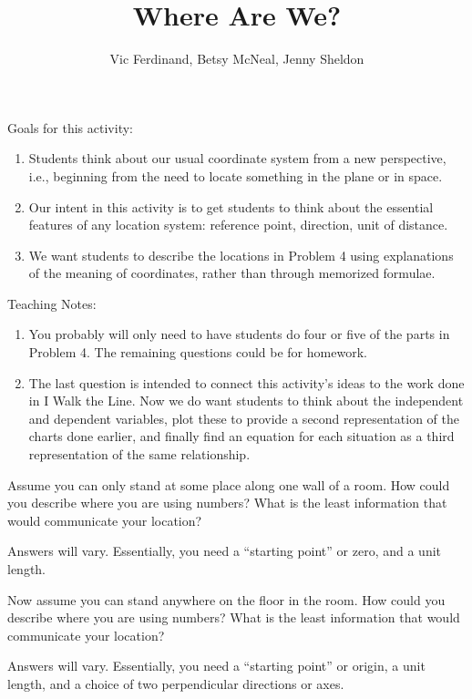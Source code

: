 \documentclass{ximera}
\title{Where Are We?}
\author{Vic Ferdinand, Betsy McNeal, Jenny Sheldon}
\begin{document}
\begin{abstract}\end{abstract}
\maketitle
\begin{instructorIntro}
Goals for this activity:
\begin{enumerate}
\item Students think about our usual coordinate system from a new perspective, i.e., beginning from the need to locate something in the plane or in space.
\item  Our intent in this activity is to get students to think about the essential features of any location system: reference point, direction, unit of distance.
\item We want students to describe the locations in Problem 4 using explanations of the meaning of coordinates, rather than through memorized formulae.
\end{enumerate}

Teaching Notes:
\begin{enumerate}
\item  You probably will only need to have students do four or five of the parts in Problem 4.  The remaining questions could be for homework.
\item  The last question is intended to connect this activity's ideas to the work done in I Walk the Line.  Now we do want students to think about the independent and dependent variables, plot these to provide a second representation of the charts done earlier, and finally find an equation for each situation as a third representation of the same relationship.
\end{enumerate}
\end{instructorIntro}


\begin{problem}
Assume you can only stand at some place along one wall of a room.  How could you describe where you are using numbers?  What is the least information that would communicate your location?

\begin{solution}
Answers will vary.  Essentially, you need a ``starting point'' or zero, and a unit length.
\end{solution}
\end{problem}

\begin{problem}
Now assume you can stand anywhere on the floor in the room.  How could you describe where you are using numbers?  What is the least information that would communicate your location?

\begin{solution}
Answers will vary.  Essentially, you need a ``starting point'' or origin, a unit length, and a choice of two perpendicular directions or axes.
\end{solution}
\end{problem}
\end{document}
